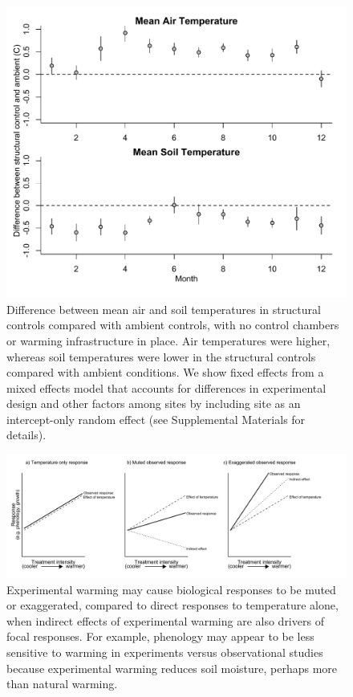 \documentclass{article}
\begin{document}
 \begin{figure}[p]
     \centering
 \includegraphics{../figures/ShamVSAmbient_mean.pdf}    
 \caption{Difference between mean air and soil temperatures in structural controls compared with ambient controls, with no control chambers or warming infrastructure in place. Air temperatures were higher, whereas soil temperatures were lower in the structural controls compared with ambient conditions. We show fixed effects from a mixed effects model that accounts for differences in experimental design and other factors among sites by including site as an intercept-only random effect (see Supplemental Materials for details). }
 \end{figure}
 \begin{figure}[p]
     \centering
 \includegraphics{../figures/DirIndWarmingEffects.pdf}    
 \caption{Experimental warming may cause biological responses to be muted or exaggerated, compared to direct responses to temperature alone, when indirect effects of experimental warming are also drivers of focal responses. For example, phenology may appear to be less sensitive to warming in experiments versus observational studies \citep{wolkovich2012} because experimental warming reduces soil moisture, perhaps more than natural warming.}
 \end{figure}
\end{document}

